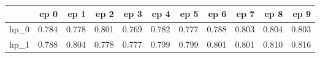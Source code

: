 \begin{tabular}{lrrrrrrrrrr}
\toprule
{} &   ep 0 &   ep 1 &   ep 2 &   ep 3 &   ep 4 &   ep 5 &   ep 6 &   ep 7 &   ep 8 &   ep 9 \\
\midrule
hp\_0 &  0.784 &  0.778 &  0.801 &  0.769 &  0.782 &  0.777 &  0.788 &  0.803 &  0.804 &  0.803 \\
hp\_1 &  0.788 &  0.804 &  0.778 &  0.777 &  0.799 &  0.799 &  0.801 &  0.801 &  0.810 &  0.816 \\
\bottomrule
\end{tabular}
